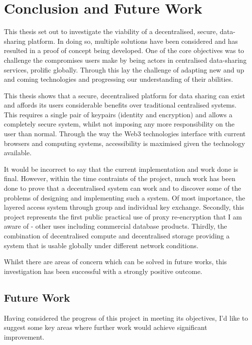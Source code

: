 \section{Conclusion and Future Work}

This thesis set out to investigate the viability of a decentralised, secure, data-sharing platform. In doing so, multiple solutions have been considered and has resulted in a proof of concept being developed. One of the core objectives was to challenge the compromises users make by being actors in centralised data-sharing services, prolific globally. Through this lay the challenge of adapting new and up and coming technologies and progressing our understanding of their abilities.

This thesis shows that a secure, decentralised platform for data sharing can exist and affords its users considerable benefits over traditional centralised systems. This requires a single pair of keypairs (identity and encryption) and allows a completely secure system, whilst not imposing any more responsibility on the user than normal. Through the way the Web3 technologies interface with current browsers and computing systems, accessibility is maximised given the technology available.

It would be incorrect to say that the current implementation and work done is final. However, within the time contraints of the project, much work has been done to prove that a decentralised system can work and to discover some of the problems of designing and implementing such a system. Of most importance, the layered access system through group and individual key exchange. Secondly, this project represents the first public practical use of proxy re-encryption that I am aware of - other uses including commercial database products. Thirdly, the combination of decentralised compute and decentralised storage providing a system that is usable globally under different network conditions.

Whilst there are areas of concern which can be solved in future works, this investigation has been successful with a strongly positive outcome.

\subsection{Future Work}

Having considered the progress of this project in meeting its objectives, I'd like to suggest some key areas where further work would achieve significant improvement.


